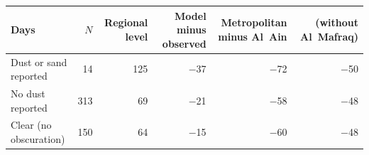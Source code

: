 \begin{tabular}{lrrrrr}
\toprule
Days & $N$ & Regional level & Model minus observed & Metropolitan minus Al~Ain & (without Al~Mafraq) \\
\midrule
Dust or sand reported & 14 & 125 & $-$37 & $-$72 & $-$50 \\
No dust reported & 313 & 69 & $-$21 & $-$58 & $-$48 \\
Clear (no obscuration) & 150 & 64 & $-$15 & $-$60 & $-$48 \\
\bottomrule
\end{tabular}

